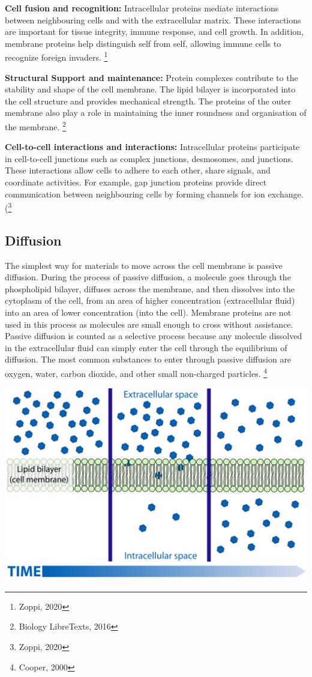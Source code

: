 \documentclass[a4paper,12pt,twoside,english]{all-in-one} %
\begin{document}
\textbf{Cell fusion and recognition:}
Intracellular proteins mediate interactions between neighbouring cells and with the extracellular matrix. These interactions are important for tissue integrity, immune response, and cell growth. In addition, membrane proteins help distinguish self from self, allowing immune cells to recognize foreign invaders. \footnote{Zoppi, 2020}

\textbf{Structural Support and maintenance:}
Protein complexes contribute to the stability and shape of the cell membrane. The lipid bilayer is incorporated into the cell structure and provides mechanical strength. The proteins of the outer membrane also play a role in maintaining the inner roundness and organisation of the membrane. \footnote{Biology LibreTexts, 2016}

\textbf{Cell-to-cell interactions and interactions:}
Intracellular proteins participate in cell-to-cell junctions such as complex junctions, desmosomes, and junctions. These interactions allow cells to adhere to each other, share signals, and coordinate activities. For example, gap junction proteins provide direct communication between neighbouring cells by forming channels for ion exchange. (\footnote{Zoppi, 2020}

\subsection{Diffusion}
The simplest way for materials to move across the cell membrane is passive diffusion. During the process of passive diffusion, a molecule goes through the phospholipid bilayer, diffuses across the membrane, and then dissolves into the cytoplasm of the cell, from an area of higher concentration (extracellular fluid) into an area of lower concentration (into the cell). Membrane proteins are not used in this process as molecules are small enough to cross without assistance. Passive diffusion is counted as a selective process because any molecule dissolved in the extracellular fluid can simply enter the cell through the equilibrium of diffusion. The most common substances to enter through passive diffusion are oxygen, water, carbon dioxide, and other small non-charged particles. \footnote{Cooper, 2000}

\includegraphics[scale=0.36]{images/3.png}
\end{document}
